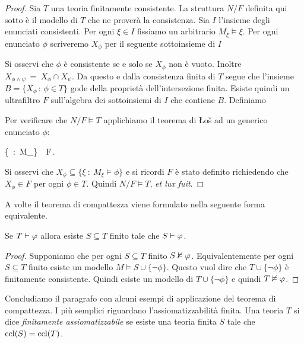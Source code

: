\begin{proof}
Sia  $T$ una teoria finitamente consistente. La struttura $N/F$ definita qui sotto \`e il modello di $T$ che ne prover\`a la consistenza. Sia $I$ l'insieme degli enunciati consistenti. Per ogni $\xi\in I$ fissiamo un arbitrario $M_\xi\models\xi$. Per ogni enunciato $\phi$ scriveremo $X_\phi$ per il seguente sottoinsieme di $I$


Si osservi che $\phi$ \`e consistente se e solo se $X_\phi$ non \`e vuoto. Inoltre $X_{\phi\wedge\psi}\ =\ X_\phi\cap X_\psi$. Da questo e dalla consistenza finita di $T$ segue che l'insieme $B=\big\{X_\phi\,:\,\phi\in T\big\}$ gode della propriet\`a dell'intersezione finita. Esiste quindi un ultrafiltro $F$ sull'algebra dei sottoinsiemi di $I$ che contiene $B$. Definiamo


Per verificare che $N/F\models T$ applichiamo il teorema di \L o\v{s} ad un generico enunciato $\phi$:

%
{\IFF}%
{\Big\{\xi\ :\ M_\xi\models\phi\Big\}\ \in\ F\,.}

Si osservi che $X_\phi\subseteq \big\{\xi\ :\ M_\xi\models \phi\big\}$ e si ricordi $F$ \`e stato definito richiedendo che $X_\phi\in F$ per ogni $\phi\in T$. Quindi $N/F\models T$, \textit{et lux fuit}.
\end{proof}

A volte il teorema di compattezza viene formulato nella seguente forma equivalente.

\begin{corollary}\label{compattezza2}
Se $T\vdash\varphi$ allora esiste $S\subseteq T$ finito tale che $S\vdash\varphi$.
\end{corollary}

\begin{proof}
Supponiamo che per ogni  $S\subseteq T$ finito $S\nvDash\varphi$. Equivalentemente per ogni $S\subseteq T$ finito esiste un modello $M\models S\cup\{\neg\phi\}$. Questo vuol dire che $T\cup\{\neg\phi\}$ \`e finitamente consistente. Quindi esiste un modello di $T\cup\{\neg\phi\}$ e quindi $T\nvDash \varphi$.
\end{proof}

Concludiamo il paragrafo con alcuni esempi di applicazione del teorema di compattezza. I pi\`u semplici riguardano l'assiomatizzabilit\`a finita. Una teoria $T$ si dice \emph{finitamente assiomatizzabile\/} se esiste una teoria finita $S$ tale che ${\rm ccl}(S)={\rm ccl}(T)$.

